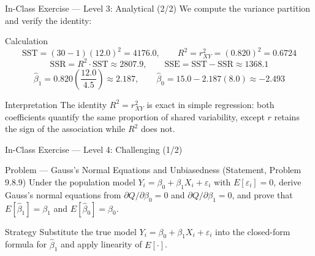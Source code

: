 \documentclass[10pt, aspectratio=169]{beamer}
\begin{document}
\begin{frame}{In-Class Exercise --- Level 3: Analytical (2/2)}
  \scriptsize
  We compute the variance partition and verify the identity: \pause

  \vspace{0.05cm}
  \begin{block}{Calculation}
    \scriptsize
    $$\text{SST}=(30-1)(12.0)^2=4176.0, \qquad R^2=r_{XY}^2=(0.820)^2=0.6724$$
    $$\text{SSR}=R^2\cdot\text{SST}\approx2807.9, \qquad \text{SSE}=\text{SST}-\text{SSR}\approx1368.1$$
    $$\hat\beta_1=0.820\left(\frac{12.0}{4.5}\right)\approx2.187, \qquad \hat\beta_0=15.0-2.187(8.0)\approx-2.493$$
  \end{block}

  \vspace{0.05cm}
  \pause
  \begin{alertblock}{Interpretation}
    \scriptsize
    The identity $R^2=r_{XY}^2$ is exact in simple regression: both coefficients quantify the same proportion of shared variability, except $r$ retains the sign of the association while $R^2$ does not.
  \end{alertblock}
\end{frame}

\begin{frame}{In-Class Exercise --- Level 4: Challenging (1/2)}
  \footnotesize
  \begin{block}{Problem --- Gauss's Normal Equations and Unbiasedness (Statement, Problem 9.8.9)}
    Under the population model $Y_i=\beta_0+\beta_1 X_i+\varepsilon_i$ with $E[\varepsilon_i]=0$, derive Gauss's normal equations from $\partial Q/\partial\beta_0=0$ and $\partial Q/\partial\beta_1=0$, and prove that $E[\hat\beta_1]=\beta_1$ and $E[\hat\beta_0]=\beta_0$.
  \end{block}

  \vspace{0.1cm}
  \pause
  \begin{alertblock}{Strategy}
    \scriptsize
    Substitute the true model $Y_i=\beta_0+\beta_1X_i+\varepsilon_i$ into the closed-form formula for $\hat\beta_1$ and apply linearity of $E[\cdot]$.
  \end{alertblock}
\end{frame}
\end{document}
